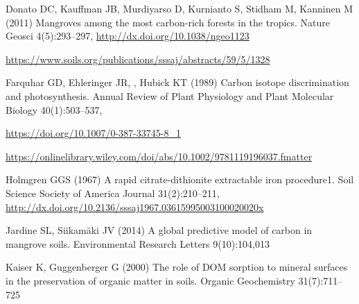 \begin{thebibliography}{29}
\DIFaddend {}
Donato DC, Kauffman JB, Murdiyarso D, Kurnianto S, Stidham M, Kanninen M (2011)
  Mangroves among the most carbon-rich forests in the tropics. Nature Geosci
  4(5):293--297, \urlprefix\url{http://dx.doi.org/10.1038/ngeo1123}

\DIFaddbegin {}
\urlprefix\url{https://www.soils.org/publications/sssaj/abstracts/59/5/1328}

\DIFaddend {}
Farquhar GD, Ehleringer JR, , Hubick KT (1989) Carbon isotope discrimination
  and photosynthesis. Annual Review of Plant Physiology and Plant Molecular
  Biology 40(1):503--537, 

\DIFaddbegin {}
\DIFadd{,
  }\urlprefix\url{https://doi.org/10.1007/0-387-33745-8_1}

\DIFadd{,
  }\urlprefix\url{https://onlinelibrary.wiley.com/doi/abs/10.1002/9781119196037.fmatter}\DIFadd{,
  }

\DIFaddend {}
Holmgren GGS (1967) A rapid citrate-dithionite extractable iron procedure1.
  Soil Science Society of America Journal 31(2):210--211,
  \urlprefix\url{http://dx.doi.org/10.2136/sssaj1967.03615995003100020020x}

Jardine SL, Siikam\"aki JV (2014) A global predictive model of carbon in
  mangrove soils. Environmental Research Letters 9(10):104,013

Kaiser K, Guggenberger G (2000) {The role of DOM sorption to mineral surfaces
  in the preservation of organic matter in soils}. Organic Geochemistry
  31(7):711--725


\end{thebibliography}
